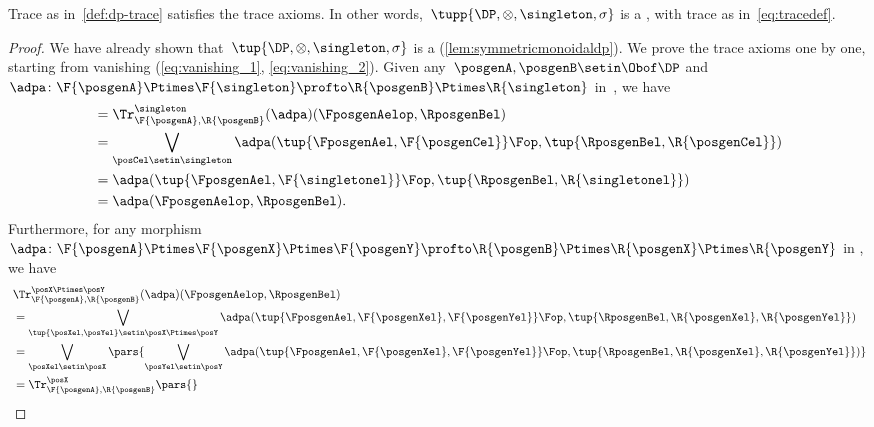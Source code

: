 {    \begin{lemma}\label{lem:dp-trace-is-trace}
        Trace as in~\cref{def:dp-trace} satisfies the trace axioms.
        In other words,~$\tupp{\DP, \otimes, \singleton, \sigma}$ is a , with trace as in~\cref{eq:tracedef}.
    \end{lemma}
    \begin{proof}
        We have already shown that~$\tup{\DP,\otimes,\singleton,\sigma}$ is a  (\cref{lem:symmetricmonoidaldp}).
        We prove the trace axioms one by one, starting from vanishing (\cref{eq:vanishing_1}, \cref{eq:vanishing_2}).
        Given any~$\posgenA,\posgenB\setin \Obof\DP$ and~$\adpa\colon \F{\posgenA}\Ptimes \F{\singleton}\profto \R{\posgenB}\Ptimes \R{\singleton}$ in~\DP, we have
        \begin{equation}
            \begin{aligned}
                 & = \Tr_{\F{\posgenA},\R{\posgenB}}^{\singleton}(\adpa)(\FposgenAelop,\RposgenBel) \\
                 & =\bigvee_{\posCel\setin \singleton}\adpa(\tup{\FposgenAel,\F{\posgenCel}}\Fop,\tup{\RposgenBel,\R{\posgenCel}}) \\
                 & =\adpa(\tup{\FposgenAel,\F{\singletonel}}\Fop,\tup{\RposgenBel,\R{\singletonel}}) \\
                 & =\adpa(\FposgenAelop,\RposgenBel).
            \end{aligned}
        \end{equation}
        Furthermore, for any morphism~$\adpa\colon \F{\posgenA}\Ptimes \F{\posgenX}\Ptimes \F{\posgenY} \profto \R{\posgenB}\Ptimes \R{\posgenX} \Ptimes \R{\posgenY}$ in \DP, we have
        \begin{equation}
            \begin{aligned}
                ~ & \Tr_{\F{\posgenA},\R{\posgenB}}^{\posX\Ptimes\posY}(\adpa)(\FposgenAelop,\RposgenBel) \\
                  & = \bigvee_{\tup{\posXel,\posYel} \setin \posX\Ptimes \posY} \adpa(\tup{\FposgenAel,\F{\posgenXel},\F{\posgenYel}}\Fop,\tup{\RposgenBel,\R{\posgenXel},\R{\posgenYel}}) \\
                  & =\bigvee_{\posXel \setin \posX}\pars{\bigvee_{\posYel \setin \posY} \adpa(\tup{\FposgenAel,\F{\posgenXel},\F{\posgenYel}}\Fop,\tup{\RposgenBel,\R{\posgenXel},\R{\posgenYel}})} \\
                  & =\Tr_{\F{\posgenA},\R{\posgenB}}^\posX\pars{
}
\end{aligned}
\end{equation}
\end{proof}}
